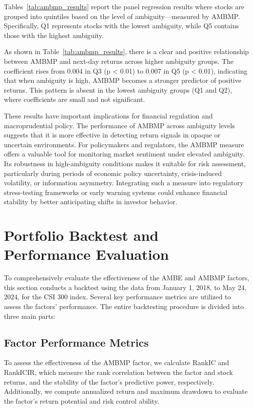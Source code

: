 \documentclass[preprint,12pt,authoryear]{elsarticle}
\begin{document}
Tables~\ref{tab:ambmp_results} report the panel regression results where stocks are grouped into quintiles based on the level of ambiguity—measured by AMBMP. Specifically, Q1 represents stocks with the lowest ambiguity, while Q5 contains those with the highest ambiguity.

As shown in Table~\ref{tab:ambmp_results}, there is a clear and positive relationship between AMBMP and next-day returns across higher ambiguity groups. The coefficient rises from 0.004 in Q3 (p < 0.01) to 0.007 in Q5 (p < 0.01), indicating that when ambiguity is high, AMBMP becomes a stronger predictor of positive returns. This pattern is absent in the lowest ambiguity groups (Q1 and Q2), where coefficients are small and not significant.

These results have important implications for financial regulation and macroprudential policy. The performance of AMBMP across ambiguity levels suggests that it is more effective in detecting return signals in opaque or uncertain environments. For policymakers and regulators, the AMBMP measure offers a valuable tool for monitoring market sentiment under elevated ambiguity. Its robustness in high-ambiguity conditions makes it suitable for risk assessment, particularly during periods of economic policy uncertainty, crisis-induced volatility, or information asymmetry. Integrating such a measure into regulatory stress-testing frameworks or early warning systems could enhance financial stability by better anticipating shifts in investor behavior.

\section{Portfolio Backtest and Performance Evaluation}
To comprehensively evaluate the effectiveness of the AMBE and AMBMP factors, this section conducts a backtest using the data from January 1, 2018, to May 24, 2024, for the CSI 300 index. Several key performance metrics are utilized to assess the factors' performance. The entire backtesting procedure is divided into three main parts:

\subsection{Factor Performance Metrics}
To assess the effectiveness of the AMBMP factor, we calculate RankIC and RankICIR, which measure the rank correlation between the factor and stock returns, and the stability of the factor's predictive power, respectively. Additionally, we compute annualized return and maximum drawdown to evaluate the factor's return potential and risk control ability.
\end{document}
